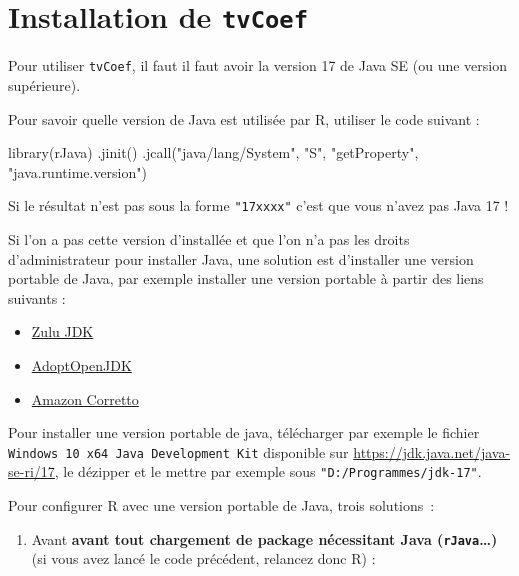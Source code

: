 \documentclass[
  a4paper,
  DIV=11,
  numbers=noendperiod,
  french]{scrartcl}
\newenvironment{Shaded}{\begin{snugshade}}{\end{snugshade}}
\newcommand{\FunctionTok}[1]{\textcolor[rgb]{0.28,0.35,0.67}{#1}}
\newcommand{\NormalTok}[1]{\textcolor[rgb]{0.00,0.23,0.31}{#1}}
\newcommand{\StringTok}[1]{\textcolor[rgb]{0.13,0.47,0.30}{#1}}
\providecommand{\tightlist}{%
  \setlength{\itemsep}{0pt}\setlength{\parskip}{0pt}}\usepackage{longtable,booktabs,array}
\newcommand\1{{\mathds 1}}
\theoremstyle{remark}
\begin{document}
\newpage
\appendix

\section{\texorpdfstring{Installation de
\texttt{tvCoef}}{Installation de tvCoef}}\label{installation-de-tvcoef}

Pour utiliser \texttt{tvCoef}, il faut il faut avoir la version 17 de
Java SE (ou une version supérieure).

Pour savoir quelle version de Java est utilisée par R, utiliser le code
suivant :

\begin{Shaded}
\begin{Highlighting}[]
\FunctionTok{library}\NormalTok{(rJava)}
\FunctionTok{.jinit}\NormalTok{()}
\FunctionTok{.jcall}\NormalTok{(}\StringTok{"java/lang/System"}\NormalTok{, }\StringTok{"S"}\NormalTok{, }\StringTok{"getProperty"}\NormalTok{, }\StringTok{"java.runtime.version"}\NormalTok{)}
\end{Highlighting}
\end{Shaded}

Si le résultat n'est pas sous la forme \texttt{"17xxxx"} c'est que vous
n'avez pas Java 17 !

Si l'on a pas cette version d'installée et que l'on n'a pas les droits
d'administrateur pour installer Java, une solution est d'installer une
version portable de Java, par exemple installer une version portable à
partir des liens suivants :

\begin{itemize}
\item
  \href{https://www.azul.com/downloads/\#zulu}{Zulu JDK}
\item
  \href{https://adoptopenjdk.net/}{AdoptOpenJDK}
\item
  \href{https://aws.amazon.com/corretto/}{Amazon Corretto}
\end{itemize}

Pour installer une version portable de java, télécharger par exemple le
fichier \texttt{Windows\ 10\ x64\ Java\ Development\ Kit} disponible sur
\url{https://jdk.java.net/java-se-ri/17}, le dézipper et le mettre par
exemple sous \texttt{"D:/Programmes/jdk-17"}.

Pour configurer R avec une version portable de Java, trois solutions~:

\begin{enumerate}
\def\labelenumi{\arabic{enumi}.}
\tightlist
\item
  Avant \textbf{avant tout chargement de package nécessitant Java
  (\texttt{rJava}\ldots)} (si vous avez lancé le code précédent,
  relancez donc R) :
\end{enumerate}
\end{document}
